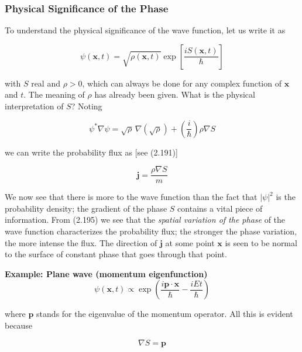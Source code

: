 \documentclass[11pt,a4paper]{article}
\begin{document}
\subsubsection{Physical Significance of the Phase}

To understand the physical significance of the wave function, let us write it as

\begin{equation}
\psi(\mathbf{x}, t) = \sqrt{\rho(\mathbf{x}, t)}\exp\left[\frac{iS(\mathbf{x}, t)}{\hbar}\right]
\tag{2.193}
\end{equation}

with $S$ real and $\rho > 0$, which can always be done for any complex function of $\mathbf{x}$ and $t$. The meaning of $\rho$ has already been given. What is the physical interpretation of $S$? Noting

\begin{equation}
\psi^*\nabla\psi = \sqrt{\rho}\,\nabla(\sqrt{\rho}) + \left(\frac{i}{\hbar}\right)\rho\nabla S
\tag{2.194}
\end{equation}

we can write the probability flux as [see (2.191)]

\begin{equation}
\boxed{\mathbf{j} = \frac{\rho\nabla S}{m}}
\tag{2.195}
\end{equation}

We now see that there is more to the wave function than the fact that $|\psi|^2$ is the probability density; the gradient of the phase $S$ contains a vital piece of information. From (2.195) we see that the \textit{spatial variation of the phase} of the wave function characterizes the probability flux; the stronger the phase variation, the more intense the flux. The direction of $\mathbf{j}$ at some point $\mathbf{x}$ is seen to be normal to the surface of constant phase that goes through that point.

\textbf{Example: Plane wave (momentum eigenfunction)}
\begin{equation}
\psi(\mathbf{x}, t) \propto \exp\left(\frac{i\mathbf{p}\cdot\mathbf{x}}{\hbar} - \frac{iEt}{\hbar}\right)
\tag{2.196}
\end{equation}

where $\mathbf{p}$ stands for the eigenvalue of the momentum operator. All this is evident because

\begin{equation}
\nabla S = \mathbf{p}
\tag{2.197}
\end{equation}
\end{document}

